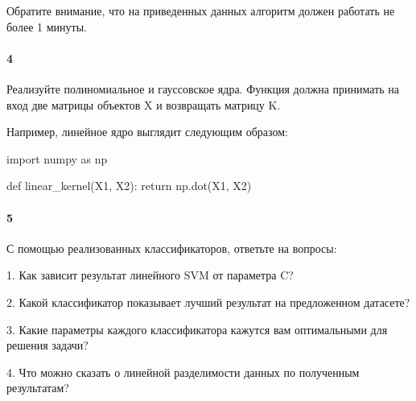 \documentclass[a4paper,12pt]{article}
\begin{document}
Обратите внимание, что на приведенных данных алгоритм должен работать не более 1 минуты.

\paragraph{4} Реализуйте полиномиальное и гауссовское ядра. Функция должна принимать на вход две матрицы объектов X и возвращать матрицу K.

Например, линейное ядро выглядит следующим образом:
\begin{python3}
import numpy as np

def linear_kernel(X1, X2):
    return np.dot(X1, X2)
\end{python3}

\paragraph{5} 
С помощью реализованных классификаторов, ответьте на вопросы:

1. Как зависит результат линейного SVM от параметра C?

2. Какой классификатор показывает лучший результат на предложенном датасете?

3. Какие параметры каждого классификатора кажутся вам оптимальными для решения задачи?

4. Что можно сказать о линейной разделимости данных по полученным результатам?
\end{document}
